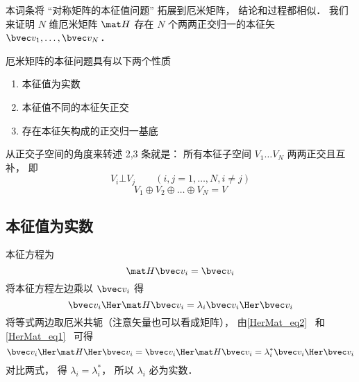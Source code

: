 
\begin{issues}
\issueTODO
\end{issues}


本词条将 “对称矩阵的本征值问题” 拓展到厄米矩阵， 结论和过程都相似． 我们来证明 $N$ 维厄米矩阵 $\mat H$ 存在 $N$ 个两两正交归一的本征矢 $\bvec v_1, \dots, \bvec v_N$．


\begin{theorem}{}
厄米矩阵的本征问题具有以下两个性质
\begin{enumerate}
\item 本征值为实数
\item 本征值不同的本征矢正交
\item 存在本征矢构成的正交归一基底
\end{enumerate}
\end{theorem}

从正交子空间的角度来转述 2,3 条就是： 所有本征子空间 $V_1 \dots V_N$ 两两正交且互补， 即
\begin{equation}
V_i\bot V_j \qquad (i, j = 1,\dots, N, i \ne j)
\end{equation}
\begin{equation}
V_1\oplus V_2 \oplus\dots \oplus V_N = V
\end{equation}


\subsection{本征值为实数}
本征方程为
\begin{equation}
\mat H \bvec v_i = \bvec v_i
\end{equation}
将本征方程左边乘以 $\bvec v_i$ 得
\begin{equation}
\bvec v_i\Her \mat H \bvec v_i = \lambda_i \bvec v_i\Her \bvec v_i
\end{equation}
将等式两边取厄米共轭（注意矢量也可以看成矩阵）， 由\autoref{HerMat_eq2}~ 和\autoref{HerMat_eq1}~ 可得
\begin{equation}
\bvec v_i\Her \mat H\Her \bvec v_i = \bvec v_i\Her \mat H \bvec v_i = \lambda_i^* \bvec v_i\Her \bvec v_i
\end{equation}
对比两式， 得 $\lambda_i = \lambda_i^*$， 所以 $\lambda_i$ 必为实数．

